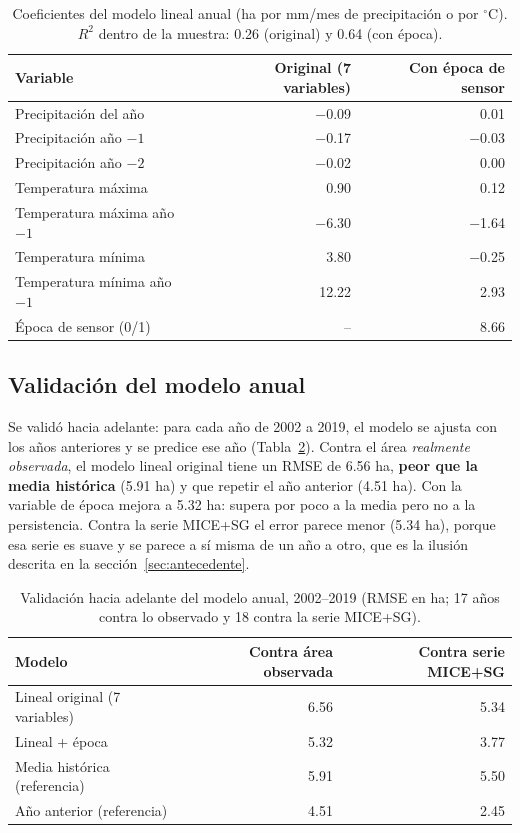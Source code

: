 \documentclass[11pt,a4paper]{article}
\begin{document}
\begin{table}[H]
\centering
\caption{Coeficientes del modelo lineal anual (ha por mm/mes de precipitación o por $^\circ$C). $R^2$ dentro de la muestra: 0.26 (original) y 0.64 (con época).}
\label{tab:mcoef}
\small
\begin{tabular}{lrr}
\toprule
Variable & Original (7 variables) & Con época de sensor \\
\midrule
Precipitación del año & $-$0.09 & 0.01 \\
Precipitación año $-1$ & $-$0.17 & $-$0.03 \\
Precipitación año $-2$ & $-$0.02 & 0.00 \\
Temperatura máxima & 0.90 & 0.12 \\
Temperatura máxima año $-1$ & $-$6.30 & $-$1.64 \\
Temperatura mínima & 3.80 & $-$0.25 \\
Temperatura mínima año $-1$ & 12.22 & 2.93 \\
Época de sensor (0/1) & -- & 8.66 \\
\bottomrule
\end{tabular}
\end{table}


\subsection{Validación del modelo anual}

Se validó hacia adelante: para cada año de 2002 a 2019, el modelo se ajusta con los años anteriores y se predice ese año (Tabla~\ref{tab:mval}). Contra el área \emph{realmente observada}, el modelo lineal original tiene un RMSE de 6.56 ha, \textbf{peor que la media histórica} (5.91 ha) y que repetir el año anterior (4.51 ha). Con la variable de época mejora a 5.32 ha: supera por poco a la media pero no a la persistencia. Contra la serie MICE+SG el error parece menor (5.34 ha), porque esa serie es suave y se parece a sí misma de un año a otro, que es la ilusión descrita en la sección~\ref{sec:antecedente}.

\begin{table}[H]
\centering
\caption{Validación hacia adelante del modelo anual, 2002--2019 (RMSE en ha; 17 años contra lo observado y 18 contra la serie MICE+SG).}
\label{tab:mval}
\small
\begin{tabular}{lrr}
\toprule
Modelo & Contra área observada & Contra serie MICE+SG \\
\midrule
Lineal original (7 variables) & 6.56 & 5.34 \\
Lineal + época & 5.32 & 3.77 \\
Media histórica (referencia) & 5.91 & 5.50 \\
Año anterior (referencia) & 4.51 & 2.45 \\
\bottomrule
\end{tabular}
\end{table}
\end{document}
